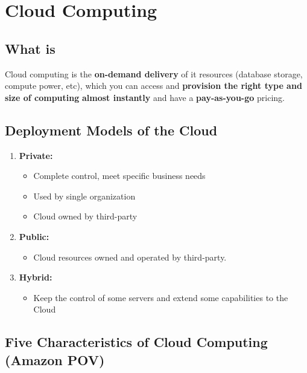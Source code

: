 \section{Cloud Computing}\label{sec:cloud-computing}

\subsection{What is}\label{subsec:what-is-cloud-computing}

Cloud computing is the \textbf{on-demand delivery} of it resources (database storage, compute power, etc), which you can access and \textbf{provision the right type and size of computing} \textbf{almost instantly} and have a \textbf{pay-as-you-go} pricing.

\subsection{Deployment Models of the Cloud}\label{subsec:deployment-models-of-the-cloud}

\begin{enumerate}
	\item \textbf{Private:}
	\begin{itemize}
		\item Complete control, meet specific business needs
		\item Used by single organization
		\item Cloud owned by third-party
	\end{itemize}
  	\item \textbf{Public:}
  	\begin{itemize}
  		\item Cloud resources owned and operated by third-party.
  	\end{itemize}
  	\item \textbf{Hybrid:}
  	\begin{itemize}
  		\item Keep the control of some servers and extend  some capabilities to the Cloud
  	\end{itemize}
\end{enumerate}

\subsection{Five Characteristics of Cloud Computing (Amazon POV)}\label{subsec:five-characteristics-of-cloud-computing-(amazon-pov)}

